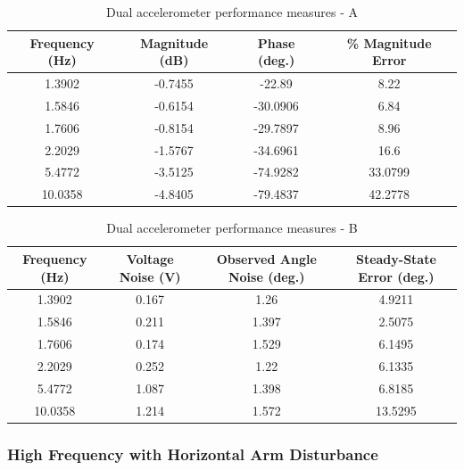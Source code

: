 \documentclass{article}
\theoremstyle{plain}
\theoremstyle{definition}
\theoremstyle{remark}
\begin{document}
\begin{table}
\begin{center}
    \begin{tabular}{|c|c|c|c|}
        \hline
        Frequency (Hz)  & Magnitude (dB) & Phase (deg.) & \% Magnitude Error \\ \hline
	1.3902  & -0.7455  & -22.89 & 8.22\\
       1.5846  & -0.6154  & -30.0906 & 6.84\\
	1.7606  & -0.8154 & -29.7897 & 8.96  \\
	2.2029 & -1.5767  & -34.6961 & 16.6   \\
	5.4772 & -3.5125  & -74.9282 & 33.0799  \\
	10.0358 & -4.8405 & -79.4837 & 42.2778 \\
        \hline
    \end{tabular}
\caption{Dual accelerometer performance measures - A}  
\label{dual_tableA}
\end{center}
\end{table}

\begin{table}
\begin{center}
    \begin{tabular}{|c|c|c|c|}
        \hline
        Frequency (Hz)  & Voltage Noise (V) & Observed Angle Noise (deg.) & Steady-State Error (deg.) \\ \hline
	1.3902  & 0.167  & 1.26 & 4.9211\\
       1.5846  & 0.211  & 1.397 & 2.5075 \\
	1.7606  & 0.174 & 1.529 & 6.1495  \\
	2.2029 & 0.252  & 1.22 & 6.1335   \\
	5.4772 & 1.087  & 1.398 & 6.8185  \\
	10.0358 & 1.214 & 1.572 & 13.5295 \\
        \hline
    \end{tabular}
\caption{Dual accelerometer performance measures - B}  
\label{dual_tableB}
\end{center}
\end{table}

\subsubsection{High Frequency with Horizontal Arm Disturbance}

\end{document}
